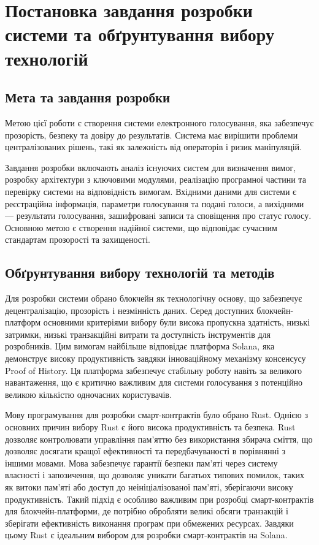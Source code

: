 \documentclass[14pt]{extreport}
\begin{document}
  \chapter{Постановка завдання розробки системи та обґрунтування вибору технологій}

  \section{Мета та завдання розробки}
  
  Метою цієї роботи є створення системи електронного голосування, яка забезпечує прозорість, безпеку та довіру до результатів. Система має вирішити проблеми централізованих рішень, такі як залежність від операторів і ризик маніпуляцій.

  Завдання розробки включають аналіз існуючих систем для визначення вимог, розробку архітектури з ключовими модулями, реалізацію програмної частини та перевірку системи на відповідність вимогам. Вхідними даними для системи є реєстраційна інформація, параметри голосування та подані голоси, а вихідними — результати голосування, зашифровані записи та сповіщення про статус голосу. Основною метою є створення надійної системи, що відповідає сучасним стандартам прозорості та захищеності.
  
  \section{Обґрунтування вибору технологій та методів}
  
  Для розробки системи обрано блокчейн як технологічну основу, що забезпечує децентралізацію, прозорість і незмінність даних. Серед доступних блокчейн-платформ основними критеріями вибору були висока пропускна здатність, низькі затримки, низькі транзакційні витрати та доступність інструментів для розробників. Цим вимогам найбільше відповідає платформа Solana, яка демонструє високу продуктивність завдяки інноваційному механізму консенсусу Proof of History. Ця платформа забезпечує стабільну роботу навіть за великого навантаження, що є критично важливим для системи голосування з потенційно великою кількістю одночасних користувачів.

  Мову програмування для розробки смарт-контрактів було обрано Rust. Однією з основних причин вибору Rust є його висока продуктивність та безпека. Rust дозволяє контролювати управління пам'яттю без використання збирача сміття, що дозволяє досягати кращої ефективності та передбачуваності в порівнянні з іншими мовами. Мова забезпечує гарантії безпеки пам'яті через систему власності і запозичення, що дозволяє уникати багатьох типових помилок, таких як витоки пам'яті або доступ до неініціалізованої пам'яті, зберігаючи високу продуктивність. Такий підхід є особливо важливим при розробці смарт-контрактів для блокчейн-платформи, де потрібно обробляти великі обсяги транзакцій і зберігати ефективність виконання програм при обмежених ресурсах. Завдяки цьому Rust є ідеальним вибором для розробки смарт-контрактів на Solana.
\end{document}

